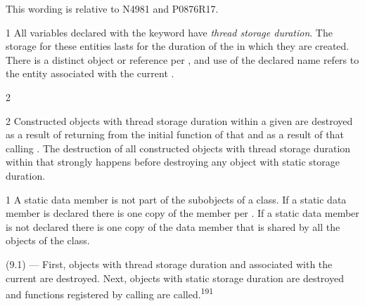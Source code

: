 \documentclass[fontsize=10pt,paper=A4,pagesize,DIV=15]{scrartcl}
\begin{document}

\label{api}

This wording is relative to N4981\cite{Standard} and P0876R17.\cite{P0876R17}


1 All variables declared with the  keyword have
\emph{thread storage duration}.
The storage for these entities lasts for the duration of
the  in which they are created. There is a distinct object or reference
per , and use of the declared name refers to the entity associated with
the current .

2 


2 Constructed objects with thread storage duration within a given 
are destroyed as a result of returning from the initial function of that  and as a
result of that  calling .
The destruction of all constructed objects with thread storage
duration within that  strongly happens before destroying
any object with static storage duration.


1 A static data member is not part of the subobjects of a class. If a
static data member is declared  there is one copy of
the member per . If a static data member is not declared
 there is one copy of the data member that is shared by all
the objects of the class.


(9.1) --- First, objects with thread storage duration and associated with the current
are destroyed. Next, objects with static storage duration are destroyed
and functions registered by calling
are called.\textsuperscript{191}
\end{document}

